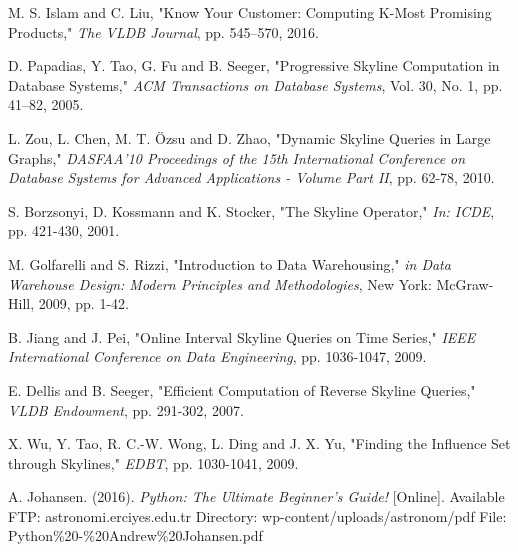 \begin{thebibliography}{9}
	M. S. Islam and C. Liu, "Know Your Customer: Computing K-Most Promising Products," \textit{The VLDB Journal}, pp. 545–570, 2016.
	
	D. Papadias, Y. Tao, G. Fu and B. Seeger, "Progressive Skyline Computation in Database Systems," \textit{ACM Transactions on Database Systems}, Vol. 30, No. 1, pp. 41–82, 2005.
	
	L. Zou, L. Chen, M. T. Özsu and D. Zhao, "Dynamic Skyline Queries in Large Graphs," \textit{DASFAA'10 Proceedings of the 15th International Conference on Database Systems for Advanced Applications - Volume Part II}, pp. 62-78, 2010.
	
	S. Borzsonyi, D. Kossmann and K. Stocker, "The Skyline Operator," \textit{In: ICDE}, pp. 421-430, 2001.
	
	M. Golfarelli and S. Rizzi, "Introduction to Data Warehousing," \textit{in Data Warehouse Design: Modern Principles and Methodologies}, New York: McGraw-Hill, 2009, pp. 1-42. 
	
	B. Jiang and J. Pei, "Online Interval Skyline Queries on Time Series," \textit{IEEE International Conference on Data Engineering}, pp. 1036-1047, 2009.
	
	E. Dellis and B. Seeger, "Efficient Computation of Reverse Skyline Queries," \textit{VLDB Endowment}, pp. 291-302, 2007.
	
	X. Wu, Y. Tao, R. C.-W. Wong, L. Ding and J. X. Yu, "Finding the Influence Set through Skylines," \textit{EDBT}, pp. 1030-1041, 2009.
	
	A. Johansen. (2016). \textit{Python: The Ultimate Beginner’s Guide!} [Online]. Available FTP: astronomi.erciyes.edu.tr Directory: wp-content/uploads/astronom/pdf File: Python\%20-\%20Andrew\%20Johansen.pdf
		
\end{thebibliography}

